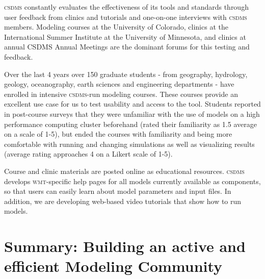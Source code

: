 \documentclass[11pt, oneside]{amsart}
\DeclareRobustCommand{\csdms}{\textsc{csdms}}
\DeclareRobustCommand{\wmt}{\textsc{wmt}}
\begin{document}

\csdms{} constantly evaluates the effectiveness of its tools and standards
through user feedback from clinics and tutorials and one-on-one interviews
with \csdms{} members.  Modeling courses at the University of Colorado,
clinics at the International Summer Institute at the University of Minnesota,
and clinics at annual CSDMS Annual Meetings are the dominant forums for
this testing and feedback. 


Over the last 4 years over 150 graduate students - from geography, hydrology,
geology, oceanography, earth sciences and engineering departments - have
enrolled in intensive \csdms{}-run modeling courses. These courses
provide an excellent use case for us to test usability and access to the
tool. Students reported in post-course surveys that they were unfamiliar with
the use of models on a high performance computing cluster beforehand (rated
their familiarity as 1.5 average on a scale of 1-5), but ended the courses
with familiarity and being more comfortable with running and changing
simulations as well as visualizing results (average rating approaches 4 on
a Likert scale of 1-5). 


Course and clinic materials are posted online as educational resources.
\csdms{} develops \wmt{}-specific help pages for all models currently
available as components, so that users can easily learn about model
parameters and input files. In addition, we are developing web-based video
tutorials that show how to run models.

\section{Summary: Building an active and efficient Modeling Community}
\end{document}
